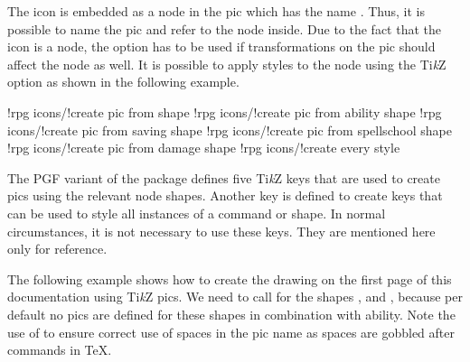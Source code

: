 \documentclass[a4paper]{article}
\begin{document}
The icon is embedded as a node in the pic which has the name . Thus, it is possible to name the pic and refer to the node inside. Due to the fact that the icon is a node, the option  has to be used if transformations on the pic should affect the node as well. It is possible to apply styles to the node using the Ti\emph{k}Z option  as shown in the following example.

\begin{codeexample}
\end{codeexample}

\begin{macrodef}
!rpg icons/!create pic from shape
!rpg icons/!create pic from ability shape
!rpg icons/!create pic from saving shape
!rpg icons/!create pic from spellschool shape
!rpg icons/!create pic from damage shape
!rpg icons/!create every style
\end{macrodef}
The PGF variant of the package defines five Ti\emph{k}Z keys that are used to create pics using the relevant node shapes. Another key is defined to create keys that can be used to style all instances of a command or shape. In normal circumstances, it is not necessary to use these keys. They are mentioned here only for reference.

The following example shows how to create the drawing on the first page of this documentation using Ti\emph{k}Z pics. We need to call  for the shapes ,  and , because per default no pics are defined for these shapes in combination with ability. Note the use of \macro{\space} to ensure correct use of spaces in the pic name as spaces are gobbled after commands in TeX.

\begin{codeexample}

\end{codeexample}
\end{document}
